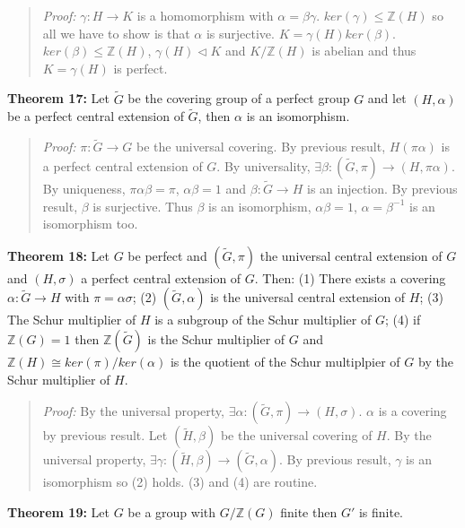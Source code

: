 \begin{quote}
\emph{Proof:}  
$\gamma: H \rightarrow K$ is a homomorphism with $\alpha = \beta \gamma$.
$ker( \gamma ) \le {\mathbb Z}(H)$ so all we have to show is that $\alpha$ is surjective.
$K= \gamma (H) ker( \beta )$.  $ker( \beta ) \le {\mathbb Z}(H)$,
$\gamma(H) \lhd K$ and $K/ {\mathbb Z}(H)$ is abelian and thus $K= \gamma(H)$ is perfect.
\end{quote}
{\bf Theorem 17:}
Let $\tilde{G}$ be the covering group of a perfect group $G$ and let $(H, \alpha)$ be
a perfect central extension of $\tilde{G}$, then $\alpha$ is an isomorphism.
\begin{quote}
\emph{Proof:}  
$\pi : \tilde{G} \rightarrow G$ be the universal covering.  By previous result,
$H( \pi \alpha)$ is a perfect central extension of $G$.  By universality,
$\exists \beta: ( \tilde{G}, \pi) \rightarrow (H, \pi \alpha )$.  By uniqueness,
$\pi \alpha \beta = \pi$, $\alpha \beta = 1$ and $\beta: \tilde{G} \rightarrow H$ is
an injection.  By previous result, $\beta$ is surjective.  Thus $\beta$ is an isomorphism,
$\alpha \beta = 1$, $\alpha = \beta^{-1}$ is an isomorphism too.
\end{quote}
{\bf Theorem 18:}
Let $G$ be perfect and $(\tilde{G}, \pi)$ the universal central extension of $G$ and
$(H, \sigma)$ a perfect central extension of $G$.  Then:
(1) There exists a covering $\alpha: \tilde{G} \rightarrow H$ with $\pi = \alpha \sigma$;
(2) $(\tilde{G}, \alpha)$ is the universal central extension of $H$;
(3) The Schur multiplier of $H$ is a subgroup of the Schur multiplier of $G$;
(4) if ${\mathbb Z}(G)=1$ then ${\mathbb Z}(\tilde{G})$ is the Schur multiplier of $G$
and ${\mathbb Z}(H) \cong ker(\pi)/ker(\alpha)$ is the quotient of the Schur multiplpier of
$G$ by the Schur multiplier of $H$.
\begin{quote}
\emph{Proof:}  
By the universal property, $\exists \alpha: (\tilde{G}, \pi) \rightarrow (H, \sigma)$.
$\alpha$ is a covering by previous result.  Let $(\tilde{H}, \beta )$ be the universal covering
of $H$.  By the universal property, 
$\exists \gamma: (\tilde{H}, \beta ) \rightarrow (\tilde{G}, \alpha)$.  By previous result,
$\gamma$ is an isomorphism so (2) holds.  (3) and (4) are routine.
\end{quote}
{\bf Theorem 19:}
Let $G$ be a group with $G/{\mathbb Z}(G)$ finite then $G'$ is finite.
